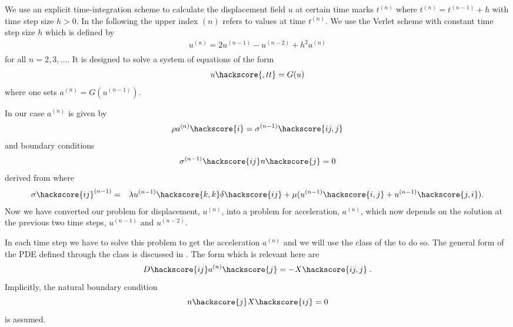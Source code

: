 We use an explicit time-integration scheme to calculate the displacement field $u$ at 
certain time marks $t^{(n)}$ where $t^{(n)}=t^{(n-1)}+h$ with time step size $h>0$. In the following the upper index ${(n)}$ refers to values at time $t^{(n)}$. We use the Verlet scheme  with constant time step size $h$
which is defined by
\begin{eqnarray} \label{WAVE dyn 2}
u^{(n)}=2u^{(n-1)}-u^{(n-2)} + h^2 a^{(n)} \\
\end{eqnarray}
for all $n=2,3,\ldots$. It is designed to solve a system of equations of the form
\begin{eqnarray} \label{WAVE dyn 2b} 
u\hackscore{,tt}=G(u)
\end{eqnarray}
where one sets $a^{(n)}=G(u^{(n-1)})$.

In our case $a^{(n)}$ is given by
\begin{eqnarray}\label{WAVE dyn 3}
\rho a^{(n)}\hackscore{i}=\sigma^{(n-1)}\hackscore{ij,j}
\end{eqnarray}
and boundary conditions
\begin{eqnarray} \label{WAVE natural at n}
\sigma^{(n-1)}\hackscore{ij}n\hackscore{j}=0
\end{eqnarray}
derived from  where 
\begin{eqnarray} \label{WAVE dyn 3a}
\sigma\hackscore{ij}^{(n-1)} & = & \lambda u^{(n-1)}\hackscore{k,k} \delta\hackscore{ij} + \mu ( u^{(n-1)}\hackscore{i,j} + u^{(n-1)}\hackscore{j,i}).
\end{eqnarray}
Now we have converted our problem for displacement, $u^{(n)}$, into a problem for 
acceleration, $a^(n)$, which now depends 
on the solution at the previous two time steps, $u^{(n-1)}$  and $u^{(n-2)}$.

In each time step we have to solve this problem to get the acceleration $a^{(n)}$ and we will
use the \LinearPDE class of the \linearPDEs to do so. The general form of the PDE defined through
the \LinearPDE class is discussed in . The form which is relevant here are  
\begin{equation}\label{WAVE dyn 100}
D\hackscore{ij} a^{(n)}\hackscore{j} = - X\hackscore{ij,j}\; .
\end{equation}
Implicitly, the natural boundary condition
\begin{equation}\label{WAVE dyn 101}
n\hackscore{j}X\hackscore{ij} =0 
\end{equation}
is assumed. 

